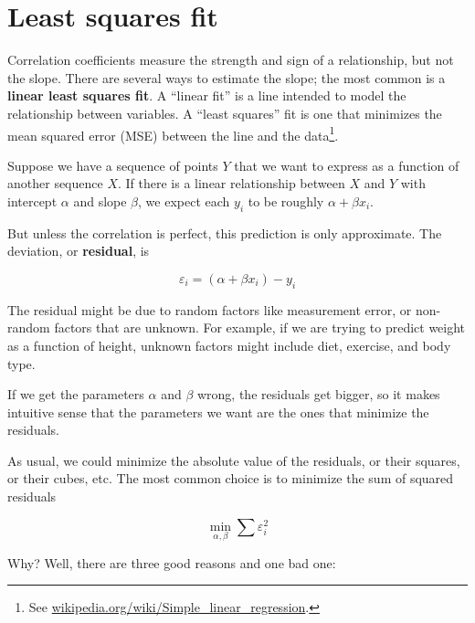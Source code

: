 \documentclass[12pt]{book}
\begin{document}
\section{Least squares fit}


\newcommand{\slope}{\beta}
\newcommand{\inter}{\alpha}


Correlation coefficients measure the strength and sign of a
relationship, but not the slope.  There are several ways to estimate
the slope; the most common is a {\bf linear least squares fit}.  A
``linear fit'' is a line intended to model the relationship between
variables.  A ``least squares'' fit is one that minimizes the mean
squared error (MSE) between the line and the data\footnote{See
  \url{wikipedia.org/wiki/Simple_linear_regression}.}.


Suppose we have a sequence of points $Y$ that we want to express as a
function of another sequence $X$.  If there is a linear relationship
between $X$ and $Y$ with intercept $\inter$ and slope $\slope$, we
expect each $y_i$ to be roughly $\inter + \slope x_i$.


But unless the correlation is perfect, this prediction is only
approximate.  The deviation, or {\bf residual}, is 

\newcommand{\eps}{\varepsilon}

\[ \eps_i = (\inter + \slope x_i) - y_i \]

The residual might be due to random factors like measurement error,
or non-random factors that are unknown.  For example, if we are
trying to predict weight as a function of height, unknown factors
might include diet, exercise, and body type.


If we get the parameters $\inter$ and $\slope$ wrong, the residuals
get bigger, so it makes intuitive sense that the parameters we want
are the ones that minimize the residuals.

As usual, we could minimize the absolute value of the
residuals, or their squares, or their cubes, etc.  The most common
choice is to minimize the sum of squared residuals

\[ \min_{\inter, \slope} \sum \eps_i^2 \]

Why?  Well, there are three good reasons and one bad one:
\end{document}
